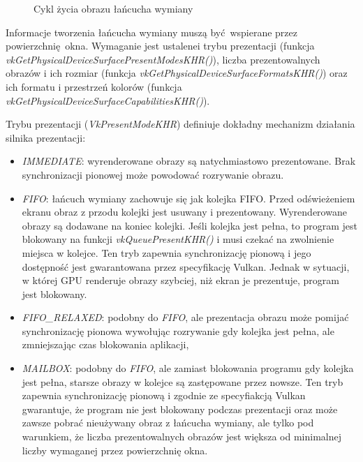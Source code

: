 \begin{figure}[H]
	\caption{Cykl życia obrazu łańcucha wymiany}
	\label{swap_chain}
\end{figure}

Informacje tworzenia łańcucha wymiany muszą być wspierane przez powierzchnię okna.
Wymaganie jest ustalenei trybu prezentacji (funkcja \textit{vkGetPhysicalDeviceSurfacePresentModesKHR()}), liczba prezentowalnych obrazów i ich rozmiar (funkcja \textit{vkGetPhysicalDeviceSurfaceFormatsKHR()}) oraz ich formatu i przestrzeń kolorów (funkcja \textit{vkGetPhysicalDeviceSurfaceCapabilitiesKHR()}).

Trybu prezentacji (\textit{VkPresentModeKHR}) definiuje dokładny mechanizm działania silnika prezentacji:
\begin{itemize}
	\item \textit{IMMEDIATE}: wyrenderowane obrazy są natychmiastowo prezentowane. Brak synchronizacji pionowej może powodować rozrywanie obrazu.
	\item \textit{FIFO}: łańcuch wymiany zachowuje się jak kolejka FIFO. Przed odświeżeniem ekranu obraz z przodu kolejki jest usuwany i prezentowany. Wyrenderowane obrazy są dodawane na koniec kolejki. Jeśli kolejka jest pełna, to program jest blokowany na funkcji \textit{vkQueuePresentKHR()} i musi czekać na zwolnienie miejsca w kolejce. Ten tryb zapewnia synchronizację pionową i jego dostępność jest gwarantowana przez specyfikację Vulkan. Jednak w sytuacji, w której GPU renderuje obrazy szybciej, niż ekran je prezentuje, program jest blokowany.
	\item \textit{FIFO\_RELAXED}: podobny do \textit{FIFO}, ale prezentacja obrazu może pomijać synchronizację pionowa wywołując rozrywanie gdy kolejka jest pełna, ale zmniejszając czas blokowania aplikacji,
	\item \textit{MAILBOX}: podobny do \textit{FIFO}, ale zamiast blokowania programu gdy kolejka jest pełna, starsze obrazy w kolejce są zastępowane przez nowsze. Ten tryb zapewnia synchronizację pionową i zgodnie ze specyfiakcją Vulkan gwarantuje, że program nie jest blokowany podczas prezentacji oraz może zawsze pobrać nieużywany obraz z łańcucha wymiany, ale tylko pod warunkiem, że liczba prezentowalnych obrazów jest większa od minimalnej liczby wymaganej przez powierzchnię okna.
\end{itemize}

